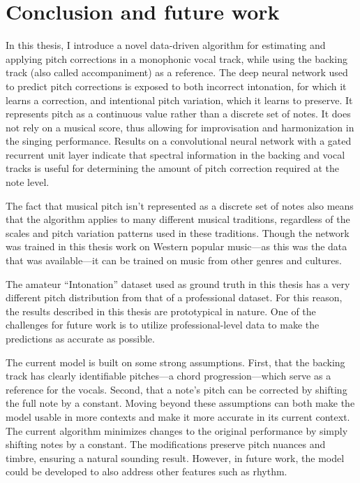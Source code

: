 \chapter{Conclusion and future work}
\label{chap:conclusion}

In this thesis, I introduce a novel data-driven algorithm for estimating and applying pitch corrections in a monophonic vocal track, while using the backing track (also called accompaniment) as a reference. The deep neural network used to predict pitch corrections is exposed to both incorrect intonation, for which it learns a correction, and intentional pitch variation, which it learns to preserve. It represents pitch as a continuous value rather than a discrete set of notes. It does not rely on a musical score, thus allowing for improvisation and harmonization in the singing performance. Results on a convolutional neural network with a gated recurrent unit layer indicate that spectral information in the backing and vocal tracks is useful for determining the amount of pitch correction required at the note level. 

The fact that musical pitch isn't represented as a discrete set of notes also means that the algorithm applies to many different musical traditions, regardless of the scales and pitch variation patterns used in these traditions. Though the network was trained in this thesis work on Western popular music---as this was the data that was available---it can be trained on music from other genres and cultures.

The amateur ``Intonation'' dataset used as ground truth in this thesis has a very different pitch distribution from that of a professional dataset. For this reason, the results described in this thesis are prototypical in nature. One of the challenges for future work is to utilize professional-level data to make the predictions as accurate as possible. 

The current model is built on some strong assumptions. First, that the backing track has clearly identifiable pitches---a chord progression---which serve as a reference for the vocals. Second, that a note's pitch can be corrected by shifting the full note by a constant. Moving beyond these assumptions can both make the model usable in more contexts and make it more accurate in its current context. The current algorithm minimizes changes to the original performance by simply shifting notes by a constant. The modifications preserve pitch nuances and timbre, ensuring a natural sounding result. However, in future work, the model could be developed to also address other features such as rhythm. 

